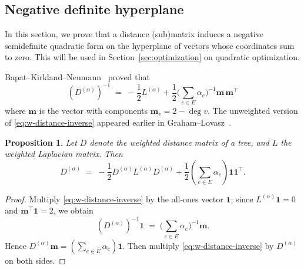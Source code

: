 \documentclass{amsart}
\newtheorem{prop}[thm]{Proposition}
\theoremstyle{definition}
\newcommand{\bone}{\mathbf{1}}
\newcommand{\boldm}{\mathbf{m}}
\newcommand{\Da}{{D^{(\alpha)}}}
\newcommand{\La}{L^{(\alpha)}}
\newcommand{\tr}{\intercal}
\begin{document}
\subsection{Negative definite hyperplane}

In this section, we prove that a distance (sub)matrix induces a negative semidefinite quadratic form on the hyperplane of vectors whose coordinates sum to zero.
This will be used in Section~\ref{sec:optimization} on quadratic optimization.

Bapat--Kirkland--Neumann~\cite[Theorem 2.1]{bapat-kirkland-neumann} proved that
\begin{equation}
\label{eq:w-distance-inverse}
	(\Da)^{-1} \;=\; - \frac12 \La + \frac12 \Big( \sum_{e \in E} \alpha_e\Big)^{-1} \boldm\, \boldm^\tr
\end{equation}
where $\boldm$ is the vector with components $\boldm_v = 2 - \deg v$.
The unweighted version of \eqref{eq:w-distance-inverse} appeared earlier in Graham--Lovasz~\cite[Lemma 1]{graham-lovasz}.

\begin{prop}
\label{prop:dist-laplacian}
Let $D$ denote the weighted distance matrix of a tree, and $L$ the weighted Laplacian matrix. 
Then
\[
	\Da \;=\; - \frac{1}{2} \Da \La \Da + \frac{1}{2} \left( \sum_{e \in E} \alpha_e\right) \bone \bone^\tr .
\]
\end{prop}
\begin{proof}
Multiply \eqref{eq:w-distance-inverse} by the all-ones vector $\bone$; since $\La \bone = 0$ and $\boldm^\tr \bone = 2$, we obtain 
\[
(\Da)^{-1} \bone \;=\; \Big( \sum_{e \in E} \alpha_e\Big)^{-1} \boldm .
\]
Hence $\Da \boldm = \left( \sum_{e \in E} \alpha_e \right) \bone$.
Then multiply \eqref{eq:w-distance-inverse} by $\Da$ on both sides. 
\end{proof}
\end{document}
